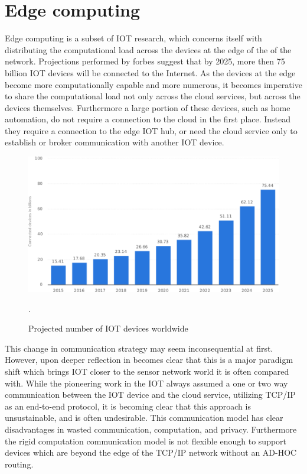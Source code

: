 \section{Edge computing}
Edge computing is a subset of IOT research, which concerns itself with distributing the computational load across the devices at the edge of the of the network. Projections performed by forbes suggest that by 2025, more then 75 billion IOT devices will be connected to the Internet. As the devices at the edge become more computationally capable and more numerous, it becomes imperative to share the computational load not only across the cloud services, but across the devices themselves. Furthermore a large portion of these devices, such as home automation, do not require a connection to the cloud in the first place. Instead they require a connection to the edge IOT hub, or need the cloud service only to establish or broker communication with another IOT device.
\begin{figure}[h]
	\centering
	\includegraphics[width=0.8\linewidth]{img/iot_statistics.pdf}	
	\caption{Projected number of IOT devices worldwide}.
	\label{lit:fig:1}
\end{figure}

This change in communication strategy may seem inconsequential at first. However, upon deeper reflection in becomes clear that this is a major paradigm shift which brings IOT closer to the sensor network world it is often compared with. While the pioneering work in the IOT always assumed a one or two way communication between the IOT device and the cloud service, utilizing TCP/IP as an end-to-end protocol, it is becoming clear that this approach is unsustainable, and is often undesirable. This communication model has clear disadvantages in wasted communication, computation, and privacy. Furthermore the rigid computation communication model is not flexible enough to support devices which are beyond the edge of the TCP/IP network without an AD-HOC routing. 

